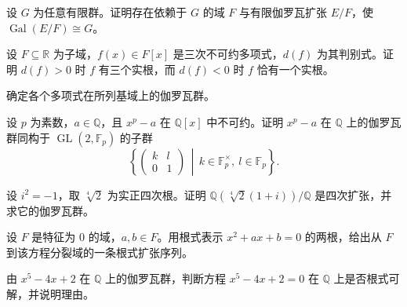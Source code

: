 \newpage
\noindent\begin{minipage}{\textwidth}
设 $G$ 为任意有限群。证明存在依赖于 $G$ 的域 $F$ 与有限伽罗瓦扩张 $E/F$，使 $\operatorname{Gal}(E/F)\cong G$。
\end{minipage}\par\vfill
\noindent\begin{minipage}{\textwidth}
设 $F\subseteq\mathbb R$ 为子域，$f(x)\in F[x]$ 是三次不可约多项式，$d(f)$ 为其判别式。证明 $d(f)>0$ 时 $f$ 有三个实根，而 $d(f)<0$ 时 $f$ 恰有一个实根。
\end{minipage}\par\vfill
\noindent\begin{minipage}{\textwidth}
确定各个多项式在所列基域上的伽罗瓦群。
\end{minipage}\par\vfill
\newpage
\noindent\begin{minipage}{\textwidth}
设 $p$ 为素数，$a\in\mathbb Q$，且 $x^p-a$ 在 $\mathbb Q[x]$ 中不可约。证明 $x^p-a$ 在 $\mathbb Q$ 上的伽罗瓦群同构于 $\operatorname{GL}(2,\mathbb F_p)$ 的子群 \[\left\{\begin{pmatrix}k&l\\0&1\end{pmatrix}\,\middle|\,k\in\mathbb F_p^\times,\ l\in\mathbb F_p\right\}.\]
\end{minipage}\par\vfill
\noindent\begin{minipage}{\textwidth}
设 $i^2=-1$，取 $\sqrt[4]2$ 为实正四次根。证明 $\mathbb Q(\sqrt[4]2(1+i))/\mathbb Q$ 是四次扩张，并求它的伽罗瓦群。
\end{minipage}\par\vfill
\noindent\begin{minipage}{\textwidth}
设 $F$ 是特征为 $0$ 的域，$a,b\in F$。用根式表示 $x^2+ax+b=0$ 的两根，给出从 $F$ 到该方程分裂域的一条根式扩张序列。
\end{minipage}\par\vfill
\newpage
\noindent\begin{minipage}{\textwidth}
由 $x^5-4x+2$ 在 $\mathbb Q$ 上的伽罗瓦群，判断方程 $x^5-4x+2=0$ 在 $\mathbb Q$ 上是否根式可解，并说明理由。
\end{minipage}\par\vfill
